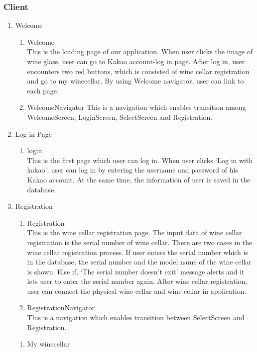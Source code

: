 \documentclass[sigconf, nonacm]{acmart}
\begin{document}
    \subsubsection{\textbf{Client}}
    \begin {enumerate}
    \item Welcome
    \begin{enumerate}
    \item Welcome\\
 This is the loading page of our application. When user clicks the image of wine glass, user can go to Kakao account-log in page. After log in, user encounters two red buttons, which is consisted of wine cellar registration and go to my winecellar. By using Welcome navigator, user can link to each page.  
\item WelcomeNavigator 
 This is a navigation which enables transition among WelcomeScreen, LoginScreen, SelectScreen and Registration.  
\end{enumerate}
\item Log in Page
 \begin{enumerate}
 \item login\\
 This is the first page which user can log in. When user clicks ‘Log in with kakao’, user can log in by entering the username and password of his Kakao account. At the same time, the information of user is saved in the database.  
\end{enumerate}
\item Registration
 \begin{enumerate}
     \item Registration\\ 
     This is the wine cellar registration page. The input data of wine cellar registration is the serial number of wine cellar. There are two cases in the wine cellar registration process. If user enters the serial number which is in the database, the serial number and the model name of the wine cellar is shown. Else if, ‘The serial number doesn’t exit’ message alerts and it lets user to enter the serial number again. After wine cellar registration, user can connect the physical wine cellar and wine cellar in application. 
     \item RegistrationNavigator\\
     This is a navigation which enables transition between SelectScreen and Registration.
 \end{enumerate}
 \begin{enumerate}
\item My winecellar\\

\end{enumerate}
\end{enumerate}
\end{document}
